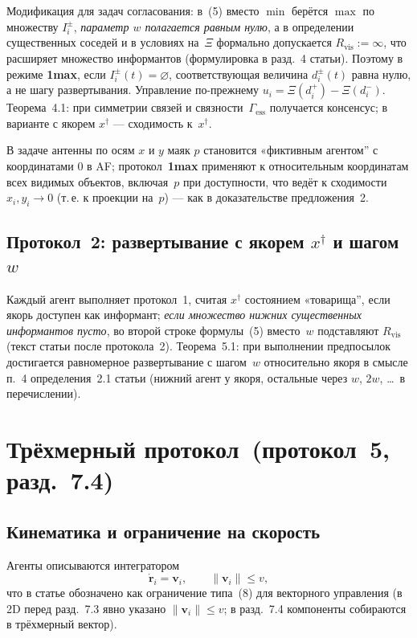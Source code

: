\documentclass[12pt,a4paper]{article}
\begin{document}
Модификация для задач согласования: в~(5) вместо $\min$ берётся $\max$ по множеству $I_i^{\pm}$, \emph{параметр $w$ полагается равным нулю}, а в определении существенных соседей и в условиях на~$\Xi$ формально допускается $R_{\mathrm{vis}}:=\infty$, что расширяет множество информантов (формулировка в разд.~4 статьи). Поэтому в режиме \textbf{1max}, если $I_i^{\pm}(t)=\varnothing$, соответствующая величина $d_i^{\pm}(t)$ равна нулю, а не шагу развертывания. Управление по-прежнему $u_i=\Xi(d_i^{+})-\Xi(d_i^{-})$. Теорема~4.1: при симметрии связей и связности~$\Gamma_{\mathrm{ess}}$ получается консенсус; в варианте с якорем $x^\dagger$ --- сходимость к~$x^\dagger$.

В задаче антенны по осям $x$ и $y$ маяк $p$ становится «фиктивным агентом'' с координатами $0$ в AF; протокол~\textbf{1max} применяют к относительным координатам всех видимых объектов, включая~$p$ при доступности, что ведёт к сходимости $x_i,y_i\to 0$ (т.\,е. к проекции на~$p$) --- как в доказательстве предложения~2.

\subsection{Протокол~2: развертывание с якорем $x^\dagger$ и шагом~$w$}

Каждый агент выполняет протокол~1, считая $x^\dagger$ состоянием «товарища'', если якорь доступен как информант; \emph{если множество нижних существенных информантов пусто}, во второй строке формулы~(5) вместо~$w$ подставляют $R_{\mathrm{vis}}$ (текст статьи после протокола~2). Теорема~5.1: при выполнении предпосылок достигается равномерное развертывание с шагом~$w$ относительно якоря в смысле п.~4 определения~2.1 статьи (нижний агент у якоря, остальные через $w$, $2w$, \ldots\ в перечислении).

\section{Трёхмерный протокол~(протокол~5, разд.~7.4)}

\subsection{Кинематика и ограничение на скорость}

Агенты описываются интегратором
\begin{equation}
  \dot{\mathbf{r}}_i=\mathbf{v}_i,\qquad \|\mathbf{v}_i\|\le v,
\end{equation}
что в статье обозначено как ограничение типа~(8) для векторного управления (в 2D перед разд.~7.3 явно указано $\|\mathbf{v}_i\|\le v$; в разд.~7.4 компоненты собираются в трёхмерный вектор).
\end{document}

